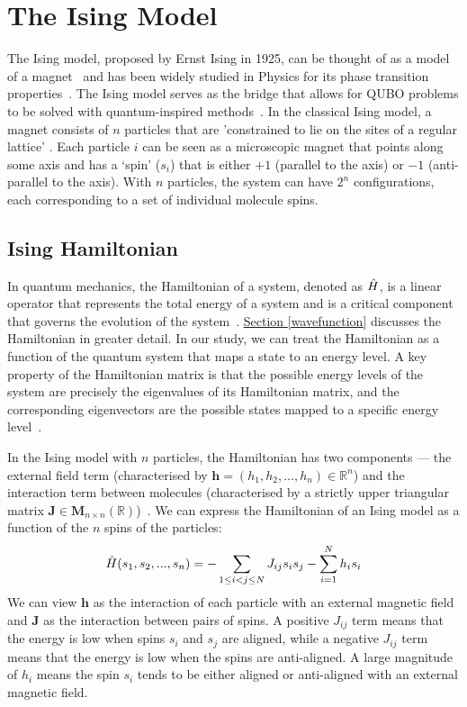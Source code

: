 \section{The Ising Model}
The Ising model, proposed by Ernst Ising in 1925, can be thought of as a model of a magnet~\cite{isingising} and has been widely studied in Physics for its phase transition properties~\cite{cipra1987introduction}. The Ising model serves as the bridge that allows for QUBO problems to be solved with quantum-inspired methods~\cite{b10}. In the classical Ising model, a magnet consists of $n$ particles that are 'constrained to lie on the sites of a regular lattice' \cite{b11}. Each particle $i$ can be seen as a microscopic magnet that points along some axis and has a `spin' ($s_i$) that is either $+1$ (parallel to the axis) or $-1$ (anti-parallel to the axis). With $n$ particles, the system can have $2^n$ configurations, each corresponding to a set of individual molecule spins.

\subsection{Ising Hamiltonian}\label{isinghamiltonian}
In quantum mechanics, the Hamiltonian of a system, denoted as $\Hat{H}$, is a linear operator that represents the total energy of a system and is a critical component that governs the evolution of the system~\cite{GriffithsSchroeter2018}. \hyperref[wavefunction]{Section \ref{wavefunction}} discusses the Hamiltonian in greater detail. In our study, we can treat the Hamiltonian as a function of the quantum system that maps a state to an energy level. A key property of the Hamiltonian matrix is that the possible energy levels of the system are precisely the eigenvalues of its Hamiltonian matrix, and the corresponding eigenvectors are the possible states mapped to a specific energy level~. 

In the Ising model with $n$ particles, the Hamiltonian has two components --- the external field term (characterised by $\mathbf{h} = (h_1, h_2, ..., h_n) \in \mathbb{R}^n$) and the interaction term between molecules (characterised by a strictly upper triangular matrix $\mathbf{J} \in \boldsymbol{M}_{n\times n}(\mathbb{R})$)~\cite{b10}. We can express the Hamiltonian of an Ising model as a function of the $n$ spins of the particles:
\begin{equation}
    \Hat{H}(s_1, s_2, ... , s_n) = -\sum_{1\leq i < j \leq N} J_{ij}s_i s_j - \sum_{i=1}^N h_i s_i
\end{equation}
We can view $\mathbf{h}$ as the interaction of each particle with an external magnetic field and $\mathbf{J}$ as the interaction between pairs of spins. A positive $J_{ij}$ term means that the energy is low when spins $s_i$ and $s_j$ are aligned, while a negative $J_{ij}$ term means that the energy is low when the spins are anti-aligned. A large magnitude of $h_i$ means the spin $s_i$ tends to be either aligned or anti-aligned with an external magnetic field.

